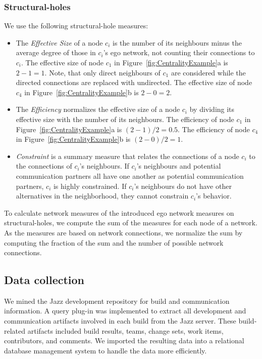 
\subsubsection{Structural-holes}
We use the following structural-hole measures:
\begin{itemize}
  \item The \emph{Effective Size} of a node $c_i$ is the number of its
  neighbours minus the average degree of those in $c_i$'s ego network, not
  counting their connections to $c_i$. The effective size of node $c_1$ in 
  Figure~\ref{fig:CentralityExample}a is $2-1=1$. Note, that only direct
  neighbours of $c_1$ are considered while the directed connections are replaced
  with undirected. The effective size of node $c_4$ in 
  Figure~\ref{fig:CentralityExample}b is $2-0=2$.
  
  \item The \emph{Efficiency} normalizes the effective size of a node $c_i$ by
  dividing its effective size with the number of its neighbours. The
  efficiency of node $c_1$ in Figure~\ref{fig:CentralityExample}a is
  $(2-1)/2=0.5$. The efficiency of node $c_4$ in
  Figure~\ref{fig:CentralityExample}b is $(2-0)/2=1$.
  
  \item \emph{Constraint} is a summary measure that relates the connections of a
  node $c_i$ to the connections of $c_i$'s neighbours. If $c_i$'s neighbours and
  potential communication partners all have one another as potential communication
  partners, $c_i$ is highly constrained. If $c_i$'s neighbours do not have other
  alternatives in the neighborhood, they cannot constrain $c_i$'s behavior. 
\end{itemize}

To calculate network measures of the introduced ego network measures on
structural-holes, we compute the sum of the measures for each node of a network.
As the measures are based on network connections, we normalize the sum by
computing the fraction of the sum and the number of possible network connections.

\subsection{Data collection} 
We mined the Jazz development repository for build and communication information.
A query plug-in was implemented to extract all development and communication
artifacts involved in each build from the Jazz server. These build-related
artifacts included build results, teams, change sets, work items, contributors,
and comments. We imported the resulting data into a relational database
management system to handle the data more efficiently.

